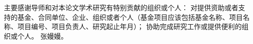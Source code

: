 \begin{thanks}


主要感谢导师和对本论文学术研究有特别贡献的组织或个人：
对提供资助或者支持的基金、合同单位、企业、组织或者个人（基金项目应该包括基金名称、项目名称、项目编号、项目负责人、研究起止年月）；
协助完成研究工作或提供便利的组织或个人。  张嫚嫚。




\end{thanks}
